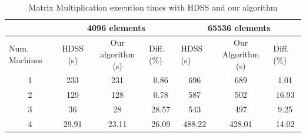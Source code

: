\documentclass[journal]{IEEEtran}
\begin{document}
\begin{table}[htb]
\centering
\caption{Matrix Multiplication execution times with HDSS and our algorithm}
\begin{scriptsize}
\begin{tabular}{c|c|c|c|c|c|c|}
\cline{2-7}
\multicolumn{1}{l|}{}                 & \multicolumn{3}{c|}{4096 elements}                              & \multicolumn{3}{c|}{65536 elements}                                                  \\ \hline
\multicolumn{1}{|l|}{Num. Machines} & HDSS (s) & Our algorithm (s) & \multicolumn{1}{l|}{Diff. (\%)} & \multicolumn{1}{l|}{HDSS (s)} & Our Algorithm (s) & \multicolumn{1}{l|}{Diff. (\%)} \\ \hline
\multicolumn{1}{|c|}{1 }       & 233     & 231              &   0.86                        
			 & 696                          &   689             &    1.01                        \\ \hline
\multicolumn{1}{|c|}{2 }      & 129     & 128              &    0.78                         
				& 587                         & 502             & 16.93                     \\ \hline
\multicolumn{1}{|c|}{3 }      & 36     & 28              & 28.57                            
			&          543                &    497           &      9.25                          \\ \hline
\multicolumn{1}{|c|}{4 }      & 29.91     & 23.11            & 26.09                       
			    & 488.22                          & 428.01              &     14.02            \\ \hline
\end{tabular}
\end{scriptsize}
\label{table: comparativo}
\end{table}
\end{document}
